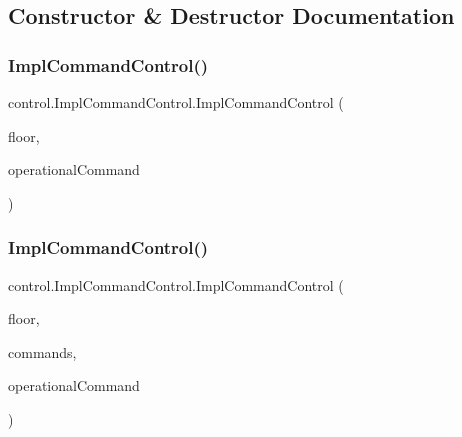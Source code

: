 \subsection{Constructor \& Destructor Documentation}
\mbox{\label{classcontrol_1_1_impl_command_control_ae6bd16309a6cd954c9dd44244ed6cdd3}} 
\subsubsection{\texorpdfstring{ImplCommandControl()}{ImplCommandControl()}\hspace{0.1cm}{\footnotesize\ttfamily [1/3]}}
{\footnotesize\ttfamily control.\+Impl\+Command\+Control.\+Impl\+Command\+Control (\begin{DoxyParamCaption}\item[{int}]{floor,  }\item[{\mbox{\hyperlink{interfacecontrol_1_1_operational_command}{Operational\+Command}}}]{operational\+Command }\end{DoxyParamCaption})}

\mbox{\label{classcontrol_1_1_impl_command_control_a57ac3479e6a08c522404266b3078db16}} 
\subsubsection{\texorpdfstring{ImplCommandControl()}{ImplCommandControl()}\hspace{0.1cm}{\footnotesize\ttfamily [2/3]}}
{\footnotesize\ttfamily control.\+Impl\+Command\+Control.\+Impl\+Command\+Control (\begin{DoxyParamCaption}\item[{int}]{floor,  }\item[{Navigable\+Set$<$ \mbox{\hyperlink{classcontrol_1_1command_1_1_floor_request}{Floor\+Request}} $>$}]{commands,  }\item[{\mbox{\hyperlink{interfacecontrol_1_1_operational_command}{Operational\+Command}}}]{operational\+Command }\end{DoxyParamCaption})}

